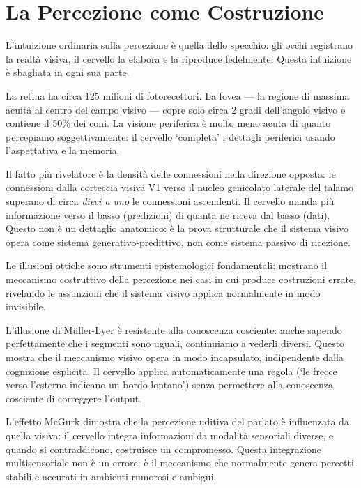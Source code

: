 \documentclass[12pt,a4paper,openany]{book}
\newcommand{\sezione}[1]{\vspace{1.2em}{\large\bfseries #1}\vspace{0.5em}\par}
\begin{document}
\chapter{La Percezione come Costruzione}

L'intuizione ordinaria sulla percezione è quella dello specchio: gli occhi registrano la realtà visiva, il cervello la elabora e la riproduce fedelmente. Questa intuizione è sbagliata in ogni sua parte.

\sezione{La neuroanatomia della visione: un sistema prevalentemente discendente}

La retina ha circa 125 milioni di fotorecettori. La fovea — la regione di massima acuità al centro del campo visivo — copre solo circa 2 gradi dell'angolo visivo e contiene il 50\% dei coni. La visione periferica è molto meno acuta di quanto percepiamo soggettivamente: il cervello `completa' i dettagli periferici usando l'aspettativa e la memoria.

Il fatto più rivelatore è la densità delle connessioni nella direzione opposta: le connessioni dalla corteccia visiva V1 verso il nucleo genicolato laterale del talamo superano di circa \textit{dieci a uno} le connessioni ascendenti. Il cervello manda più informazione verso il basso (predizioni) di quanta ne riceva dal basso (dati). Questo non è un dettaglio anatomico: è la prova strutturale che il sistema visivo opera come sistema generativo-predittivo, non come sistema passivo di ricezione.

\sezione{Le illusioni come strumenti epistemologici}

Le illusioni ottiche sono strumenti epistemologici fondamentali: mostrano il meccanismo costruttivo della percezione nei casi in cui produce costruzioni errate, rivelando le assunzioni che il sistema visivo applica normalmente in modo invisibile.

L'illusione di Müller-Lyer è resistente alla conoscenza cosciente: anche sapendo perfettamente che i segmenti sono uguali, continuiamo a vederli diversi. Questo mostra che il meccanismo visivo opera in modo incapsulato, indipendente dalla cognizione esplicita. Il cervello applica automaticamente una regola (`le frecce verso l'esterno indicano un bordo lontano') senza permettere alla conoscenza cosciente di correggere l'output.

L'effetto McGurk dimostra che la percezione uditiva del parlato è influenzata da quella visiva: il cervello integra informazioni da modalità sensoriali diverse, e quando si contraddicono, costruisce un compromesso. Questa integrazione multisensoriale non è un errore: è il meccanismo che normalmente genera percetti stabili e accurati in ambienti rumorosi e ambigui.
\end{document}
